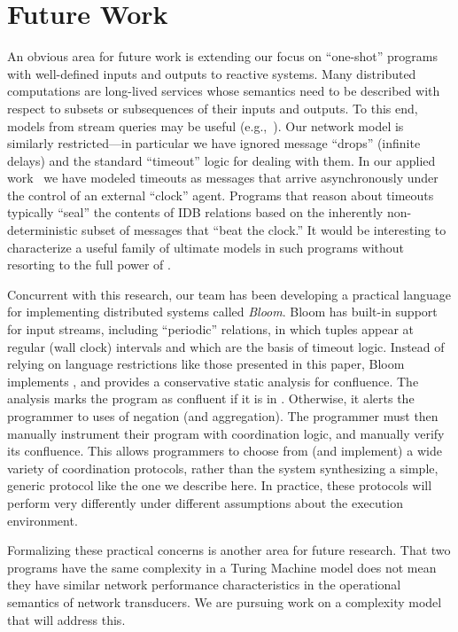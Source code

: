 \section{Future Work}
\label{sec:conclusion}

An obvious area for future work is extending our focus on ``one-shot'' programs with well-defined inputs and outputs to reactive systems.  
Many distributed computations are long-lived services whose semantics need to be described with respect to subsets or subsequences of their inputs and outputs.  To this end, models from stream queries may be useful (e.g.,~\cite{Chandramouli2009}).  
Our network model is similarly restricted---in particular we have ignored message ``drops'' (infinite delays) and the standard ``timeout'' logic for dealing with them.  In our applied work~\cite{boom,cidr11} we have modeled timeouts as messages that arrive asynchronously under the control of an external ``clock'' agent.  Programs that reason about timeouts typically ``seal'' the contents of IDB relations based on the inherently non-deterministic subset of messages that ``beat the clock.''  It would be interesting to characterize a useful family of ultimate models in such programs without resorting to the full power of \lang.

Concurrent with this research, our team has been developing a practical language for implementing distributed
systems called \emph{Bloom}.  Bloom has built-in support for input streams, including ``periodic'' relations,
in which tuples appear at regular (wall clock) intervals and which are the basis of timeout logic.
Instead of relying on language restrictions like those presented in this paper, Bloom implements \lang, and provides a conservative static analysis for confluence.  The analysis marks the program as confluent if it is in \slang.  Otherwise, it alerts the programmer to uses of negation (and aggregation).  The programmer must then manually instrument their program with coordination logic, and manually verify its confluence.
This allows programmers to choose from (and implement) a wide variety of coordination protocols, rather than the system synthesizing a simple, generic protocol like the one we describe here.  
In practice, these protocols will perform very differently under different assumptions about the execution environment.

Formalizing these practical concerns is another area for future research.  That two programs have the same complexity in a Turing Machine model does not mean they have similar network performance characteristics in the operational semantics of network transducers.  We are pursuing work on a complexity model that will address this.
